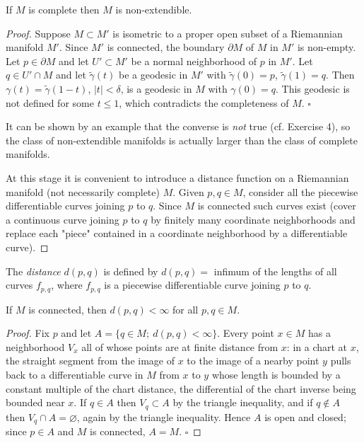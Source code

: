 \begin{proposition}[Proposition 2.3]
  \label{prop:dc-ch7-2-3}
  If $M$ is complete then $M$ is non-extendible.
\end{proposition}
\begin{proof}
  Suppose $M\subset M'$ is isometric to a proper open subset of a
  Riemannian manifold $M'$. Since $M'$ is connected, the boundary $\partial M$ of
  $M$ in $M'$ is non-empty. Let $p\in\partial M$ and let $U'\subset M'$ be a normal
  neighborhood of $p$ in $M'$. Let $q\in U'\cap M$ and let $\tilde\gamma(t)$ be a
  geodesic in $M'$ with $\tilde\gamma(0)=p$, $\tilde\gamma(1)=q$. Then
  $\gamma(t)=\tilde\gamma(1-t)$, $|t| < \delta$, is a geodesic in $M$ with
  $\gamma(0)=q$. This geodesic is not defined for some $t\le 1$, which contradicts
  the completeness of $M$. $\square$
  
  It can be shown by an example that the converse is \emph{not} true (cf. Exercise 4),
  so the class of non-extendible manifolds is actually larger than the class of
  complete manifolds.
  
  At this stage it is convenient to introduce a distance function on a Riemannian
  manifold (not necessarily complete) $M$. Given $p,q\in M$, consider all the
  piecewise differentiable curves joining $p$ to $q$. Since $M$ is connected such
  curves exist (cover a continuous curve joining $p$ to $q$ by finitely many
  coordinate neighborhoods and replace each "piece" contained in a coordinate
  neighborhood by a differentiable curve).
\end{proof}

\begin{definition}[distance]
  \label{def:dc-ch7-2-4}
  \leanok
  The \emph{distance} $d(p,q)$ is defined by $d(p,q)=$ infimum of the lengths of all
  curves $f_{p,q}$, where $f_{p,q}$ is a piecewise differentiable curve joining $p$
  to $q$.
\end{definition}

\begin{lemma}
  \label{lem:dc-ch7-2-4-finite}
  \leanok
  If $M$ is connected, then $d(p,q)<\infty$ for all $p,q\in M$.
\end{lemma}
\begin{proof}
  \leanok
  Fix $p$ and let $A=\{q\in M;\ d(p,q)<\infty\}$. Every point $x\in M$ has a
  neighborhood $V_x$ all of whose points are at finite distance from $x$: in a
  chart at $x$, the straight segment from the image of $x$ to the image of a
  nearby point $y$ pulls back to a differentiable curve in $M$ from $x$ to $y$
  whose length is bounded by a constant multiple of the chart distance, the
  differential of the chart inverse being bounded near $x$. If $q\in A$ then
  $V_q\subset A$ by the triangle inequality, and if $q\notin A$ then
  $V_q\cap A=\varnothing$, again by the triangle inequality. Hence $A$ is open
  and closed; since $p\in A$ and $M$ is connected, $A=M$. $\square$
\end{proof}

